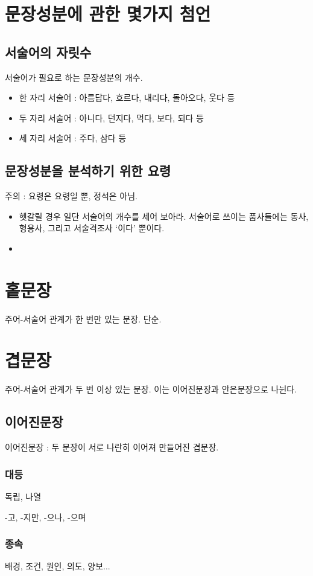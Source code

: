 \documentclass[10pt]{report}
\begin{document}
\section{문장성분에 관한 몇가지 첨언}
\subsection{서술어의 자릿수}
서술어가 필요로 하는 문장성분의 개수.
\begin{itemize}
\item 한 자리 서술어 : 아름답다, 흐르다, 내리다, 돌아오다, 웃다 등
\item 두 자리 서술어 : 아니다, 던지다, 먹다, 보다, 되다 등
\item 세 자리 서술어 : 주다, 삼다 등
\end{itemize}
\subsection{문장성분을 분석하기 위한 요령}
주의 : 요령은 요령일 뿐, 정석은 아님.
\begin{itemize}
\item 헷갈릴 경우 일단 서술어의 개수를 세어 보아라. 서술어로 쓰이는 품사들에는 동사, 형용사, 그리고 서술격조사 `이다'  뿐이다.
\item \color{blue}{추가바람}
\end{itemize}
\section{홑문장}
주어-서술어 관계가 한 번만 있는 문장. 단순.
\section{겹문장}
주어-서술어 관계가 두 번 이상 있는 문장. 이는 이어진문장과 안은문장으로 나뉜다.
\subsection{이어진문장}
이어진문장 : 두 문장이 서로 나란히 이어져 만들어진 겹문장.
\subsubsection{대등}
독립, 나열

-고, -지만, -으나, -으며
\subsubsection{종속}
배경, 조건, 원인, 의도, 양보...
\end{document}

